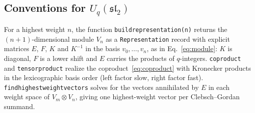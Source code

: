 \documentclass{SciPost}
\newcommand{\code}[1]{\texttt{\begingroup\def\_{\textunderscore\allowbreak}#1\endgroup}}
\newcommand{\Uq}{U_q(\mathfrak{sl}_2)}
\begin{document}
\subsection{Conventions for \texorpdfstring{$\Uq$}{Uq(sl2)}}
\label{sec:conventions}

For a highest weight $n$, the function \code{build\_representation(n)} returns the $(n+1)$-dimensional module $V_n$ as a \code{Representation} record with explicit matrices $E$, $F$, $K$ and $K^{-1}$ in the basis $v_0,\dots,v_n$, as in Eq.~\eqref{eq:module}: $K$ is diagonal, $F$ is a lower shift and $E$ carries the products of $q$-integers. \code{coproduct} and \code{tensor\_product} realize the coproduct~\eqref{eq:coproduct} with Kronecker products in the lexicographic basis order (left factor slow, right factor fast). \code{find\_highest\_weight\_vectors} solves for the vectors annihilated by $E$ in each weight space of $V_m\otimes V_n$, giving one highest-weight vector per Clebsch--Gordan summand.
\end{document}
